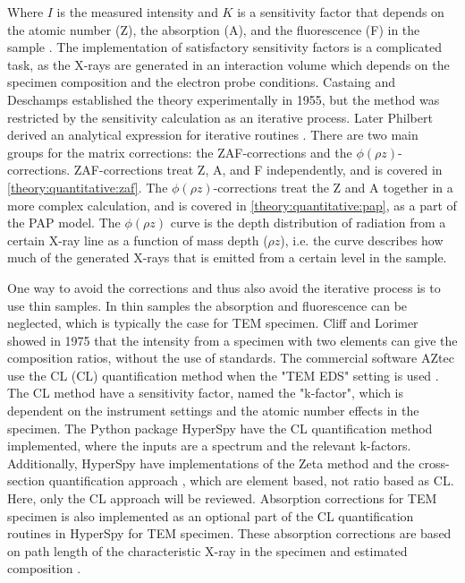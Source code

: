 Where $I$ is the measured intensity and $K$ is a sensitivity factor that depends on the atomic number (Z), the absorption (A), and the fluorescence (F) in the sample \cite{goldstein_scanning_2018,williams_carter_tem_2009}.
The implementation of satisfactory sensitivity factors is a complicated task, as the X-rays are generated in an interaction volume which depends on the specimen composition and the electron probe conditions.
Castaing and Deschamps established the theory experimentally in 1955, but the method was restricted by the sensitivity calculation as an iterative process.
Later Philbert derived an analytical expression for iterative routines \cite{philbert_1963}.
There are two main groups for the matrix corrections: the ZAF-corrections and the $\phi(\rho z)$-corrections.
ZAF-corrections treat Z, A, and F independently, and is covered in \cref{theory:quantitative:zaf}.
The $\phi(\rho z)$-corrections treat the Z and A together in a more complex calculation, and is covered in \cref{theory:quantitative:pap}, as a part of the PAP model.
The $\phi(\rho z)$ curve is the depth distribution of radiation from a certain X-ray line as a function of mass depth ($\rho z$), i.e. the curve describes how much of the generated X-rays that is emitted from a certain level in the sample.


One way to avoid the corrections and thus also avoid the iterative process is to use thin samples.
In thin samples the absorption and fluorescence can be neglected, which is typically the case for TEM specimen.
Cliff and Lorimer \cite{CL1975} showed in 1975 that the intensity from a specimen with two elements can give the composition ratios, without the use of standards.
The commercial software AZtec \cite{aztec_manual} use the CL (CL) quantification method when the "TEM EDS" setting is used \cite{oxford_blog_CL}.
The CL method have a sensitivity factor, named the "k-factor", which is dependent on the instrument settings and the atomic number effects in the specimen.
The Python package HyperSpy have the CL quantification method implemented, where the inputs are a spectrum and the relevant k-factors.
Additionally, HyperSpy have implementations of the Zeta method \cite{watanabe_williams_zeta_2006} and the cross-section quantification approach \cite{MacArthur_crosssection_2016}, which are element based, not ratio based as CL.
Here, only the CL approach will be reviewed.
Absorption corrections for TEM specimen is also implemented as an optional part of the CL quantification routines in HyperSpy for TEM specimen.
These absorption corrections are based on path length of the characteristic X-ray in the specimen and estimated composition \cite{williams_carter_tem_2009}.


